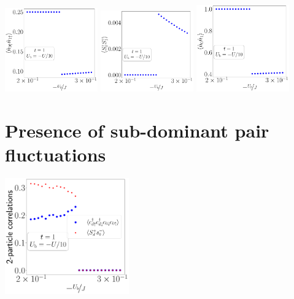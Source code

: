 \documentclass{report}
\numberwithin{equation}{section}
\begin{document}
\begin{center}
	\includegraphics[width=0.3\textwidth]{../figures/r-par-D=1000.00000,t=1.00000,J=30.00000,V=1.50000J,Ub=-Uby10,N=4,U=59.85787,93.55363,25.pdf}
	\includegraphics[width=0.3\textwidth]{../figures/r-ising-D=1000.00000,t=1.00000,J=30.00000,V=1.50000J,Ub=-Uby10,N=4,U=59.85787,93.55363,25.pdf}
	\includegraphics[width=0.3\textwidth]{../figures/r-charge-D=1000.00000,t=1.00000,J=30.00000,V=1.50000J,Ub=-Uby10,N=4,U=59.85787,93.55363,25.pdf}
\end{center}

\section{Presence of sub-dominant pair fluctuations}
\begin{center}
	\includegraphics[width=0.4\textwidth]{../figures/odlro-D=1000.00000,t=1.00000,J=30.00000,V=1.50000J,Ub=-Uby10,N=4,U=59.85787,93.55363,25.pdf}
	\label{pair_fluc}
\end{center}
\end{document}
